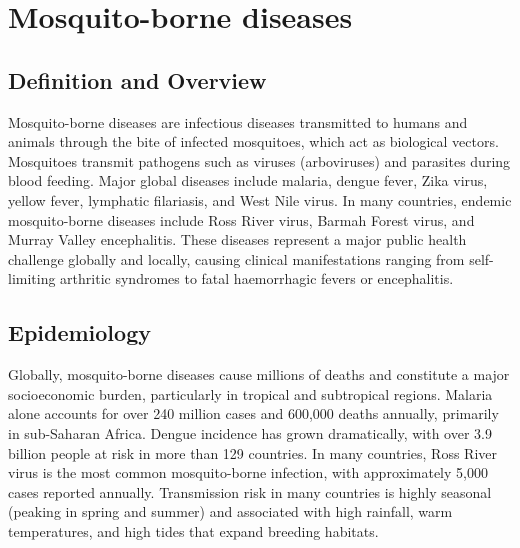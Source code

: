\chapter{Mosquito-borne diseases}

\section*{Definition and Overview}
Mosquito-borne diseases are infectious diseases transmitted to humans and animals through the bite of infected mosquitoes, which act as biological vectors. Mosquitoes transmit pathogens such as viruses (arboviruses) and parasites during blood feeding. Major global diseases include malaria, dengue fever, Zika virus, yellow fever, lymphatic filariasis, and West Nile virus. In many countries, endemic mosquito-borne diseases include Ross River virus, Barmah Forest virus, and Murray Valley encephalitis. These diseases represent a major public health challenge globally and locally, causing clinical manifestations ranging from self-limiting arthritic syndromes to fatal haemorrhagic fevers or encephalitis.

\section*{Epidemiology}
Globally, mosquito-borne diseases cause millions of deaths and constitute a major socioeconomic burden, particularly in tropical and subtropical regions. Malaria alone accounts for over 240 million cases and 600,000 deaths annually, primarily in sub-Saharan Africa. Dengue incidence has grown dramatically, with over 3.9 billion people at risk in more than 129 countries. In many countries, Ross River virus is the most common mosquito-borne infection, with approximately 5,000 cases reported annually. Transmission risk in many countries is highly seasonal (peaking in spring and summer) and associated with high rainfall, warm temperatures, and high tides that expand breeding habitats.


